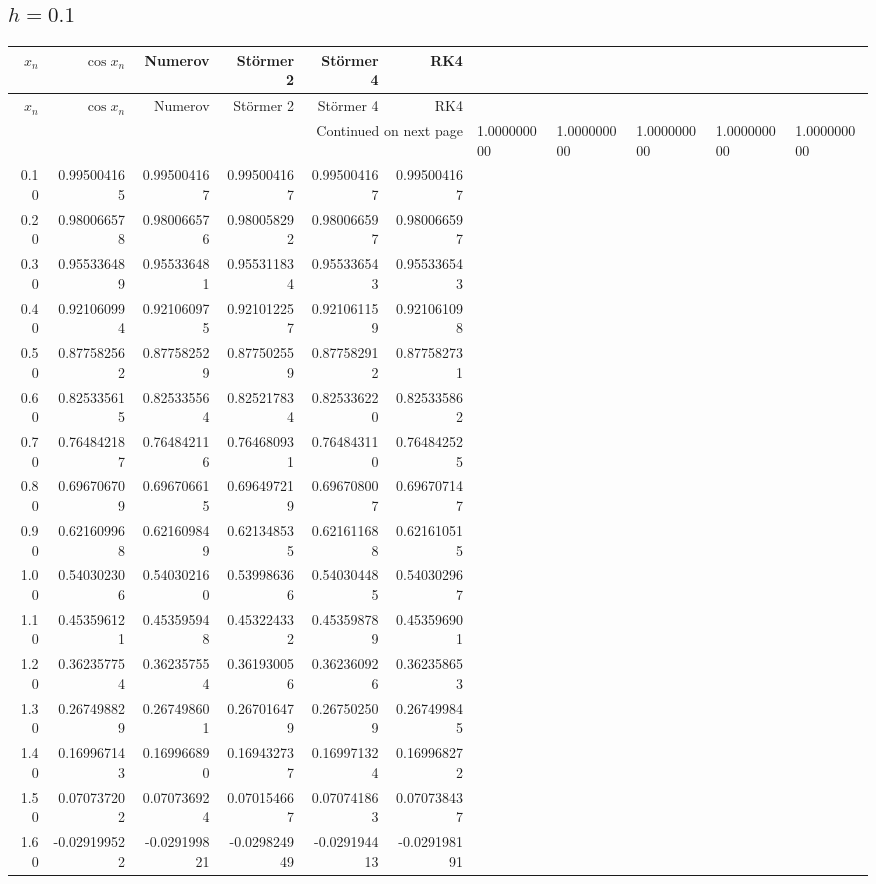 \documentclass[11pt,a4paper]{article}
\newcommand{\St}{St\"ormer}
\begin{document}
\subsection{\texorpdfstring{$h=0.1$}{h=0.1}}
\begingroup\footnotesize\setlength{\tabcolsep}{5pt}
\begin{longtable}{rrrrrr}
\toprule $x_n$ & $\cos x_n$ & Numerov & \St{} 2 & \St{} 4 & RK4 \\ \midrule
\endfirsthead
\toprule $x_n$ & $\cos x_n$ & Numerov & \St{} 2 & \St{} 4 & RK4 \\ \midrule
\endhead\midrule\multicolumn{6}{r}{Continued on next page}\endfoot\bottomrule\endlastfoot
0.00 & 1.000000000 & 1.000000000 & 1.000000000 & 1.000000000 & 1.000000000 \\
0.10 & 0.995004165 & 0.995004167 & 0.995004167 & 0.995004167 & 0.995004167 \\
0.20 & 0.980066578 & 0.980066576 & 0.980058292 & 0.980066597 & 0.980066597 \\
0.30 & 0.955336489 & 0.955336481 & 0.955311834 & 0.955336543 & 0.955336543 \\
0.40 & 0.921060994 & 0.921060975 & 0.921012257 & 0.921061159 & 0.921061098 \\
0.50 & 0.877582562 & 0.877582529 & 0.877502559 & 0.877582912 & 0.877582731 \\
0.60 & 0.825335615 & 0.825335564 & 0.825217834 & 0.825336220 & 0.825335862 \\
0.70 & 0.764842187 & 0.764842116 & 0.764680931 & 0.764843110 & 0.764842525 \\
0.80 & 0.696706709 & 0.696706615 & 0.696497219 & 0.696708007 & 0.696707147 \\
0.90 & 0.621609968 & 0.621609849 & 0.621348535 & 0.621611688 & 0.621610515 \\
1.00 & 0.540302306 & 0.540302160 & 0.539986366 & 0.540304485 & 0.540302967 \\
1.10 & 0.453596121 & 0.453595948 & 0.453224332 & 0.453598789 & 0.453596901 \\
1.20 & 0.362357754 & 0.362357554 & 0.361930056 & 0.362360926 & 0.362358653 \\
1.30 & 0.267498829 & 0.267498601 & 0.267016479 & 0.267502509 & 0.267499845 \\
1.40 & 0.169967143 & 0.169966890 & 0.169432737 & 0.169971324 & 0.169968272 \\
1.50 & 0.070737202 & 0.070736924 & 0.070154667 & 0.070741863 & 0.070738437 \\
1.60 & -0.029199522 & -0.029199821 & -0.029824949 & -0.029194413 & -0.029198191 \\

\end{longtable}
\end{document}
